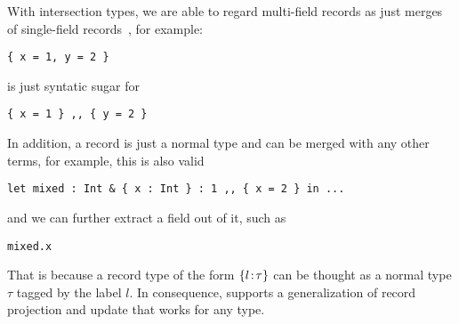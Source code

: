 {With intersection types, we are able to regard multi-field records as just
merges of single-field records~\cite{}, for example:
\begin{lstlisting}
{ x = 1, y = 2 }
\end{lstlisting}
is just syntatic sugar for
\begin{lstlisting}
{ x = 1 } ,, { y = 2 }
\end{lstlisting}
In addition, a record is just a normal type and can be merged with any other
terms, for example, this is also valid
\begin{lstlisting}
let mixed : Int & { x : Int } : 1 ,, { x = 2 } in ...
\end{lstlisting}
and we can further extract a field out of it, such as
\begin{lstlisting}
mixed.x
\end{lstlisting}
That is because a record type of the form $ \{ l \!:\! \tau \} $ can be thought as a
normal type $ \tau $ tagged by the label $ l $. In consequence, \name supports a
generalization of record projection and update that works for any type.




}
